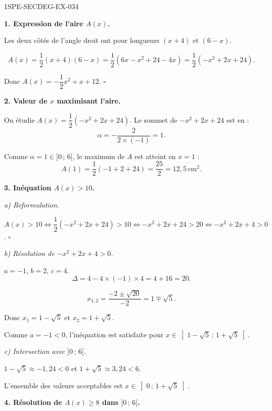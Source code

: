 \begin{corrige}{1SPE-SECDEG-EX-034}

\textbf{1. Expression de l'aire $A(x)$.}


Les deux côtés de l'angle droit ont pour longueurs $(x+4)$ et $(6-x)$.

\[A(x) = \frac{1}{2}(x+4)(6-x) = \frac{1}{2}(6x - x^2 + 24 - 4x) = \frac{1}{2}(-x^2 + 2x + 24).\]

Donc $A(x) = -\dfrac{1}{2}x^2 + x + 12$. \hfill $\square$

\medskip
\textbf{2. Valeur de $x$ maximisant l'aire.}


On étudie $A(x) = \dfrac{1}{2}(-x^2 + 2x + 24)$. Le sommet de $-x^2 + 2x + 24$ est en :
\[\alpha = -\frac{2}{2 \times (-1)} = 1.\]

Comme $\alpha = 1 \in ]0\,;\,6[$, le maximum de $A$ est atteint en $x = 1$ :
\[A(1) = \frac{1}{2}(-1 + 2 + 24) = \frac{25}{2} = 12{,}5\,\text{cm}^2.\]

\medskip
\textbf{3. Inéquation $A(x) > 10$.}

\textit{a) Reformulation.}


$A(x) > 10 \iff \dfrac{1}{2}(-x^2 + 2x + 24) > 10 \iff -x^2 + 2x + 24 > 20 \iff -x^2 + 2x + 4 > 0$. \hfill $\square$

\textit{b) Résolution de $-x^2 + 2x + 4 > 0$.}

$a = -1$, $b = 2$, $c = 4$.
\[\Delta = 4 - 4 \times (-1) \times 4 = 4 + 16 = 20.\]

\[x_{1,2} = \frac{-2 \pm \sqrt{20}}{-2} = 1 \mp \sqrt{5}.\]

Donc $x_1 = 1 - \sqrt{5}$ et $x_2 = 1 + \sqrt{5}$.

Comme $a = -1 < 0$, l'inéquation est satisfaite pour $x \in \left]1 - \sqrt{5}\,;\,1 + \sqrt{5}\right[$.

\textit{c) Intersection avec $]0\,;\,6[$.}

$1 - \sqrt{5} \approx -1{,}24 < 0$ et $1 + \sqrt{5} \approx 3{,}24 < 6$.

L'ensemble des valeurs acceptables est $x \in \left]0\,;\,1 + \sqrt{5}\right[$.

\medskip
\textbf{4. Résolution de $A(x) \geqslant 8$ dans $]0\,;\,6[$.}


\end{corrige}
